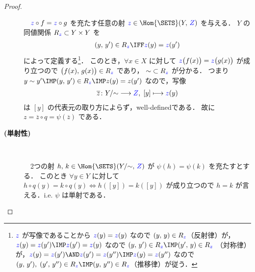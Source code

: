 \documentclass[geometry_main]{subfiles}
\begin{document}
\begin{proof}
\begin{description}
		　$\textcolor{blue}{z} \circ f = \textcolor{blue}{z} \circ g$ を充たす任意の射 $\textcolor{blue}{z} \in \Hom{\SETS}(Y,\, \textcolor{blue}{Z})$ を与える．
		$Y$ の同値関係 $R_{\textcolor{blue}{z}} \subset Y \times Y$ を
		\begin{align}
			(y,\, y') \in R_{\textcolor{blue}{z}} \IFF \textcolor{blue}{z}(y) = \textcolor{blue}{z}(y')
		\end{align}
		によって定義する\footnote{$\textcolor{blue}{z}$ が写像であることから $\textcolor{blue}{z}(y) = \textcolor{blue}{z}(y)$ なので $(y,\, y) \in R_{\textcolor{blue}{z}}$（反射律）が，$\textcolor{blue}{z}(y) = \textcolor{blue}{z}(y') \IMP \textcolor{blue}{z}(y') = \textcolor{blue}{z}(y)$ なので $(y,\, y') \in R_{\textcolor{blue}{z}} \IMP (y',\, y) \in R_{\textcolor{blue}{z}}$ （対称律）が，$\textcolor{blue}{z}(y) = \textcolor{blue}{z}(y') \AND \textcolor{blue}{z}(y') = \textcolor{blue}{z}(y'') \IMP \textcolor{blue}{z}(y) = \textcolor{blue}{z}(y'')$ なので $(y,\, y'),\; (y',\, y'') \in R_{\textcolor{blue}{z}} \IMP (y,\, y'') \in R_{\textcolor{blue}{z}}$（推移律）が従う．}．
		このとき，$\forall x \in X$ に対して $\textcolor{blue}{z} \bigl( f(x) \bigr) = \textcolor{blue}{z} \bigl( g(x) \bigr)$ が成り立つので $\bigl( f(x),\, g(x) \bigr) \in R_{\textcolor{blue}{z}}$ であり，
		${\sim} \subset R_{\textcolor{blue}{z}}$ が分かる．
		つまり $y \sim y' \IMP (y,\, y') \in R_{\textcolor{blue}{z}} \IMP z(y) = z(y')$ なので，写像
		\begin{align}
			\overline{z} \colon Y/{\sim} \longrightarrow \textcolor{blue}{Z},\; [y] \longmapsto \textcolor{blue}{z}(y)
		\end{align}
		は $[y]$ の代表元の取り方によらず，well-definedである．
		故に $z = \overline{z} \circ q = \psi(\overline{z})$ である．

		\item[\textbf{(単射性)}] 　
		
		　2つの射 $h,\, k \in \Hom{\SETS}(Y/{\sim},\, \textcolor{blue}{Z})$ が $\psi(h) = \psi(k)$ を充たすとする．
		このとき $\forall y \in Y$ に対して $h \circ q(y) = k\circ q(y) \iff h([y]) = k([y])$ が成り立つので $h = k$ が言える．i.e. $\psi$ は単射である．
	\end{description}
\end{proof}


\end{document}
